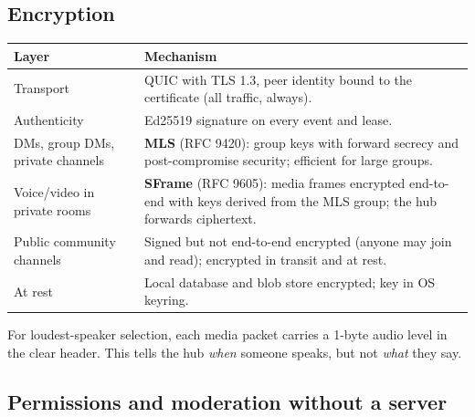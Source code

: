 \documentclass[11pt,a4paper]{article}
\begin{document}
\subsection{Encryption}
\label{sec:crypto}

\begin{center}
\small
\begin{tabularx}{\linewidth}{@{}l Y@{}}
\toprule
\textbf{Layer} & \textbf{Mechanism} \\
\midrule
Transport & QUIC with TLS 1.3, peer identity bound to the certificate (all traffic, always). \\
Authenticity & Ed25519 signature on every event and lease. \\
DMs, group DMs, private channels & \textbf{MLS} (RFC 9420): group keys with forward secrecy and post-compromise security; efficient for large groups. \\
Voice/video in private rooms & \textbf{SFrame} (RFC 9605): media frames encrypted end-to-end with keys derived from the MLS group; the hub forwards ciphertext. \\
Public community channels & Signed but not end-to-end encrypted (anyone may join and read); encrypted in transit and at rest. \\
At rest & Local database and blob store encrypted; key in OS keyring. \\
\bottomrule
\end{tabularx}
\end{center}

\noindent For loudest-speaker selection, each media packet carries a 1-byte audio level in
the clear header. This tells the hub \emph{when} someone speaks, but not \emph{what} they say.

\subsection{Permissions and moderation without a server}
\label{sec:perm}
\end{document}
